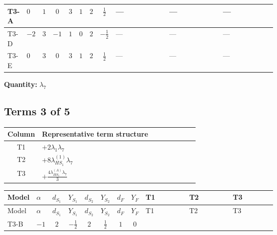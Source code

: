 \documentclass[8pt]{article}
\begin{document}
\begin{landscape}
\begin{longtable}{@{}llcccccc >{\raggedright\arraybackslash}p{0.21\linewidth} >{\raggedright\arraybackslash}p{0.21\linewidth} >{\raggedright\arraybackslash}p{0.21\linewidth}@{}}
\midrule
T3-A & $0$ & $1$ & $0$ & $3$ & $1$ & $2$ & $\frac{1}{2}$ & --- & --- & --- \\
\midrule
T3-D & $-2$ & $3$ & $-1$ & $1$ & $0$ & $2$ & $-\frac{1}{2}$ & --- & --- & --- \\
\midrule
T3-E & $0$ & $3$ & $0$ & $3$ & $1$ & $2$ & $\frac{1}{2}$ & --- & --- & --- \\
\midrule
\bottomrule
\end{longtable}
\clearpage
\noindent\textbf{Quantity: }$\lambda_{7}$\par\smallskip
\subsection*{Terms 3 of 5}
\begin{center}
\begin{tabular}{@{}c >{\raggedright\arraybackslash}p{0.82\linewidth}@{}}
\toprule
Column & Representative term structure \\
\midrule
T1 & \(\displaystyle +2 {\lambda_1} {\lambda_7}\) \\
\midrule
T2 & \(\displaystyle +8 {\lambda_{HS_1}^{(1)}} {\lambda_7}\) \\
\midrule
T3 & \(\displaystyle +\frac{4 {\lambda_{HS_1}^{(A)}} {\lambda_7}}{3}\) \\
\midrule
\bottomrule
\end{tabular}
\end{center}
\smallskip
\tiny
\begin{longtable}{@{}llcccccc >{\raggedright\arraybackslash}p{0.21\linewidth} >{\raggedright\arraybackslash}p{0.21\linewidth} >{\raggedright\arraybackslash}p{0.21\linewidth}@{}}
\toprule
Model & $\alpha$ & $d_{S_1}$ & $Y_{S_1}$ & $d_{S_2}$ & $Y_{S_2}$ & $d_F$ & $Y_F$ & T1 & T2 & T3 \\
\midrule
\endfirsthead
\toprule
Model & $\alpha$ & $d_{S_1}$ & $Y_{S_1}$ & $d_{S_2}$ & $Y_{S_2}$ & $d_F$ & $Y_F$ & T1 & T2 & T3 \\
\midrule
\endhead
T3-B & $-1$ & $2$ & $-\frac{1}{2}$ & $2$ & $\frac{1}{2}$ & $1$ & $0$ & \scriptsize\adjustbox{max width=\linewidth}{$\begin{gathered} +2 {\lambda_1} {\lambda_7}\end{gathered}$} & \scriptsize\adjustbox{max width=\linewidth}{$\begin{gathered} +8 {\lambda_{HS_1}^{(1)}} {\lambda_7}\end{gathered}$} & \scriptsize\adjustbox{max width=\linewidth}{$\begin{gathered} +\frac{4 {\lambda_{HS_1}^{(A)}} {\lambda_7}}{3}\end{gathered}$} \\

\end{longtable}
\end{landscape}
\end{document}
